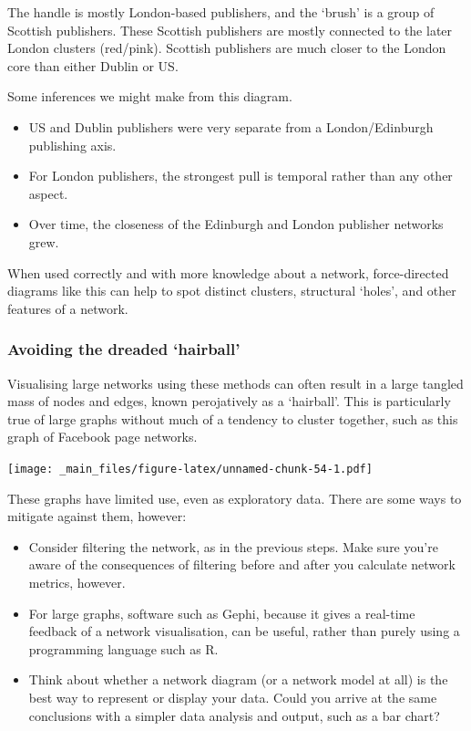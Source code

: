 \documentclass[
]{book}
\begin{document}
The handle is mostly London-based publishers, and the `brush' is a group of Scottish publishers. These Scottish publishers are mostly connected to the later London clusters (red/pink). Scottish publishers are much closer to the London core than either Dublin or US.

Some inferences we might make from this diagram.

\begin{itemize}
\item
  US and Dublin publishers were very separate from a London/Edinburgh publishing axis.
\item
  For London publishers, the strongest pull is temporal rather than any other aspect.
\item
  Over time, the closeness of the Edinburgh and London publisher networks grew.
\end{itemize}

When used correctly and with more knowledge about a network, force-directed diagrams like this can help to spot distinct clusters, structural `holes', and other features of a network.

\hypertarget{avoiding-the-dreaded-hairball}{%
\subsubsection{Avoiding the dreaded `hairball'}\label{avoiding-the-dreaded-hairball}}

Visualising large networks using these methods can often result in a large tangled mass of nodes and edges, known perojatively as a `hairball'. This is particularly true of large graphs without much of a tendency to cluster together, such as this graph of Facebook page networks\citep{musae}.

\texttt{[image: \_main\_files/figure-latex/unnamed-chunk-54-1.pdf]}

These graphs have limited use, even as exploratory data. There are some ways to mitigate against them, however:

\begin{itemize}
\item
  Consider filtering the network, as in the previous steps. Make sure you're aware of the consequences of filtering before and after you calculate network metrics, however.
\item
  For large graphs, software such as Gephi, because it gives a real-time feedback of a network visualisation, can be useful, rather than purely using a programming language such as R.
\item
  Think about whether a network diagram (or a network model at all) is the best way to represent or display your data. Could you arrive at the same conclusions with a simpler data analysis and output, such as a bar chart?
\end{itemize}
\end{document}
